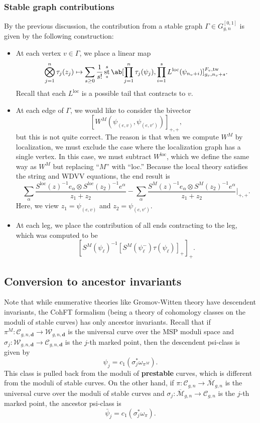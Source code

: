 \documentclass[10pt]{amsart}
\theoremstyle{definition}
\theoremstyle{remark}
\theoremstyle{plain}
\theoremstyle{definition}
\theoremstyle{remark}
\newcommand{\bd}{\mathbf{d}}
\newcommand{\msc}[1]{\mathscr{#1}}
\newcommand{\mr}[1]{\mathrm{#1}}
\newcommand{\ol}[1]{\overline{#1}}
\newcommand{\1}{\mathbf{1}}
\newcommand{\2}{\mathbf{2}}
\newcommand{\3}{\mathbf{3}}
\newcommand{\loc}{\mr{loc}}
\newcommand{\tw}{\mr{tw}}
\DeclareMathOperator{\st}{st}
\numberwithin{equation}{section}
\begin{document}
\subsubsection{Stable graph contributions}%
\label{ssub:Stable graph contributions}

By the previous discussion, the contribution from a stable graph $\Gamma \in G_{g,n}^{[0,1]}$ is given by the following construction:
\begin{itemize}
    \item At each vertex $v \in \Gamma$, we place a linear map
        \[ \bigotimes_{j=1}^n \tau_j(z_j) \mapsto \sum_{s \geq 0} \frac{1}{s!} \st^{s}_* \ab[\prod_{j=1}^n \tau_j(\psi_j), \prod_{i=1}^{s} L^{\loc}(\psi_{n_v+i})]_{g_v, n_v+s}^{F_v, \tw}. \]
        Recall that each $L^{\loc}$ is a possible tail that contracts to $v$.
    \item At each edge of $\Gamma$, we would like to consider the bivector
        \[ [W^M(\psi_{(e,v)}, \psi_{( e,v' )})]_{+,+}, \]
        but this is not quite correct. The reason is that when we compute $W^M$ by localization, we must exclude the case where the localization graph has a single vertex. In this case, we must subtract $W^{\loc}$, which we define the same way as $W^M$ but replacing ``$M$'' with ``loc.'' Because the local theory satisfies the string and WDVV equations, the end result is
        \[ \sum_{\alpha} \frac{S^{\loc}(z)^{-1} e_{\alpha} \otimes S^{loc}(z_2)^{-1} e^{\alpha}}{z_1+z_2} - \sum_{\alpha} \frac{S^M(z)^{-1} e_{\alpha} \otimes S^M(z_2)^{-1} e^{\alpha}}{z_1+z_2} \Bigg\vert_{+,+}.\]
        Here, we view $z_1 = \psi_{(e,v)}$ and $z_2 = \psi_{(e,v')}$.
    \item At each leg, we place the contribution of all ends contracting to the leg, which was computed to be
        \[ [S^M(\psi_{\ell})^{-1} [S^M(\psi_{\ell}^-)\tau(\psi_{\ell})]_+]_+. \]
\end{itemize}

\subsection{Conversion to ancestor invariants}%
\label{sub:Conversion to ancestor invariants}

Note that while enumerative theories like Gromov-Witten theory have descendent invariants, the CohFT formalism (being a theory of cohomology classes on the moduli of stable curves) has only ancestor invariants. Recall that if $\pi^M \colon \msc{C}_{g,n,\bd} \to \msc{W}_{g,n,\bd}$ is the universal curve over the MSP moduli space and $\sigma_j \colon \msc{W}_{g,n,\bd} \to \msc{C}_{g,n,\bd}$ is the $j$-th marked point, then the descendent psi-class is given by
\[ \psi_j = c_1(\sigma_j^* \omega_{\pi^M}). \]
This class is pulled back from the moduli of \textbf{prestable} curves, which is different from the moduli of stable curves. On the other hand, if $\pi\colon \msc{C}_{g,n} \to \ol{\msc{M}}_{g,n}$ is the universal curve over the moduli of stable curves and $\sigma_j \colon \ol{\msc{M}}_{g,n} \to \msc{C}_{g,n}$ is the $j$-th marked point, the ancestor psi-class is
\[ \bar{\psi}_j = c_1(\sigma_j^* \omega_{\pi}). \]
\end{document}
